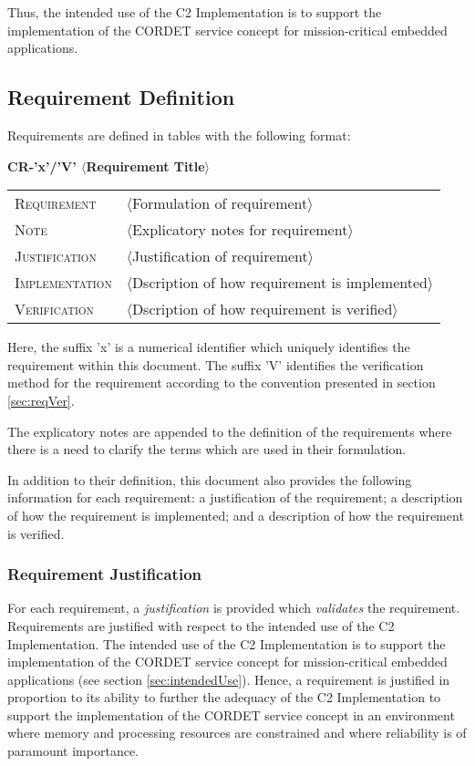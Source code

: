 \documentclass{pnp_article}
\begin{document}
Thus, the intended use of the C2 Implementation is to support the implementation of the CORDET service concept for mission-critical embedded applications.

\subsection{Requirement Definition}\label{sec:reqDef}
Requirements are defined in tables with the following format:

\hspace{0.2cm}\textbf{\hspace{1cm}CR-'x'/'V' \hspace{0.9cm} $\langle$Requirement Title$\rangle$}
\vspace{-10pt}

\begin{longtable}{p{2.7cm}P{8.5cm}}
\hline
\textsc{Requirement} & $\langle$Formulation of requirement$\rangle$ \\
\textsc{Note} & $\langle$Explicatory notes for requirement$\rangle$ \\
\textsc{Justification} & $\langle$Justification of requirement$\rangle$ \\
\textsc{Implementation} & $\langle$Dscription of how requirement is implemented$\rangle$ \\ 
\textsc{Verification} & $\langle$Dscription of how requirement is verified$\rangle$ \\
\hline
\end{longtable}

Here, the suffix 'x' is a numerical identifier which uniquely identifies the requirement
within this document. The suffix 'V' identifies the verification method for the requirement according to the convention presented in section \ref{sec:reqVer}.

The explicatory notes are appended to the definition of the requirements where there is a need to clarify the terms which are used in their formulation.

In addition to their definition, this document also provides the following information for each requirement: a justification of the requirement; a description of how the requirement is implemented; and a description of how the requirement is verified. 

\subsubsection{Requirement Justification}
For each requirement, a \emph{justification} is provided which \emph{validates} the requirement. Requirements are justified with respect to the intended use of the C2 Implementation. The intended use of the C2 Implementation is to support the implementation of the CORDET service concept for mission-critical embedded applications (see section \ref{sec:intendedUse}).  Hence, a requirement is justified in proportion to its ability to further the adequacy of the C2 Implementation to support the implementation of the CORDET service concept in an environment where memory and processing resources are constrained and where reliability is of paramount importance. 
\end{document}
